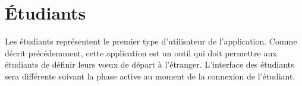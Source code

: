 \chapter{Étudiants}
\label{chap::etudiants}

Les étudiants représentent le premier type d'utilisateur de l'application. Comme décrit précédemment, cette application est un outil qui doit permettre aux étudiants de définir leurs vœux de départ à l'étranger. L'interface des étudiants sera différente suivant la phase active au moment de la connexion de l'étudiant.